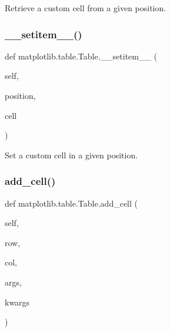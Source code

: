 \begin{DoxyVerb}Retrieve a custom cell from a given position.\end{DoxyVerb}
 \mbox{\label{classmatplotlib_1_1table_1_1Table_a8a4e780c757cefd3fc9e5493bab27296}} 
\subsubsection{\texorpdfstring{\+\_\+\+\_\+setitem\+\_\+\+\_\+()}{\_\_setitem\_\_()}}
{\footnotesize\ttfamily def matplotlib.\+table.\+Table.\+\_\+\+\_\+setitem\+\_\+\+\_\+ (\begin{DoxyParamCaption}\item[{}]{self,  }\item[{}]{position,  }\item[{}]{cell }\end{DoxyParamCaption})}

\begin{DoxyVerb}Set a custom cell in a given position.
\end{DoxyVerb}
 \mbox{\label{classmatplotlib_1_1table_1_1Table_a19bb373b8e28f862486599fd9ad4a204}} 
\subsubsection{\texorpdfstring{add\+\_\+cell()}{add\_cell()}}
{\footnotesize\ttfamily def matplotlib.\+table.\+Table.\+add\+\_\+cell (\begin{DoxyParamCaption}\item[{}]{self,  }\item[{}]{row,  }\item[{}]{col,  }\item[{}]{args,  }\item[{}]{kwargs }\end{DoxyParamCaption})}

